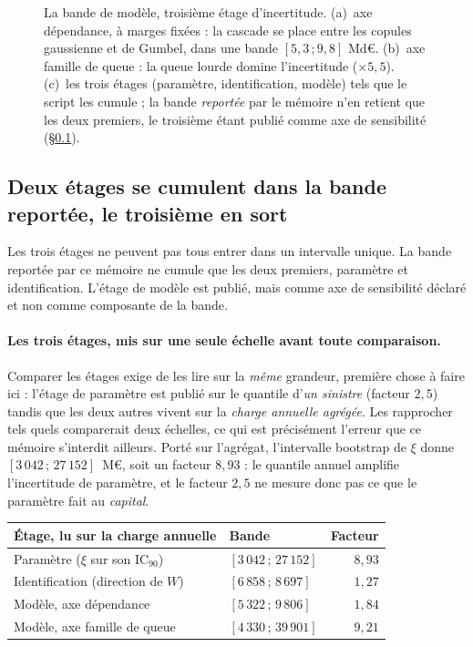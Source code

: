 \begin{figure}[htbp]\centering
{}
\caption{La bande de modèle, troisième étage d'incertitude. (a)~axe dépendance, à
marges fixées : la cascade se place entre les copules gaussienne et de Gumbel, dans une bande
$[5{,}3\,;9{,}8]$ Md\euro. (b)~axe famille de queue : la queue lourde domine
l'incertitude ($\times 5{,}5$). (c)~les trois étages (paramètre, identification,
modèle) tels que le script les cumule ; la bande \emph{reportée} par le mémoire n'en retient que
les deux premiers, le troisième étant publié comme axe de sensibilité
(\S\ref{sec:etage-modele-hors-bande}).}
\label{fig:bande-modele}
\end{figure}

\subsection{Deux étages se cumulent dans la bande reportée, le troisième en sort}
\label{sec:etage-modele-hors-bande}

Les trois étages ne peuvent pas tous entrer dans un intervalle unique. La bande reportée par ce mémoire ne cumule que les deux premiers,
paramètre et identification. L'étage de modèle est publié, mais comme axe de
sensibilité déclaré et non comme composante de la bande.

\paragraph{Les trois étages, mis sur une seule échelle avant toute comparaison.} Comparer les
étages exige de les lire sur la \emph{même} grandeur, première chose à faire ici :
l'étage de paramètre est publié sur le quantile d'\emph{un sinistre} (facteur $2{,}5$) tandis que
les deux autres vivent sur la \emph{charge annuelle agrégée}. Les rapprocher tels quels
comparerait deux échelles, ce qui est précisément l'erreur que ce mémoire s'interdit ailleurs.
Porté sur l'agrégat, l'intervalle bootstrap de $\xi$ donne $[3\,042\,;\,27\,152]$~M\euro, soit un
facteur $8{,}93$ : le quantile annuel amplifie l'incertitude de paramètre, et le facteur
$2{,}5$ ne mesure donc pas ce que le paramètre fait au \emph{capital}.

\begin{center}\footnotesize
\renewcommand{\arraystretch}{1.25}
\begin{tabular}{@{}l l r@{}}
\toprule
\textbf{Étage, lu sur la charge annuelle} & \textbf{Bande} & \textbf{Facteur} \\
\midrule
Paramètre ($\xi$ sur son IC$_{90}$) & $[3\,042\,;\,27\,152]$ & $8{,}93$ \\
Identification (direction de $W$) & $[6\,858\,;\,8\,697]$ & $1{,}27$ \\
Modèle, axe dépendance & $[5\,322\,;\,9\,806]$ & $1{,}84$ \\
Modèle, axe famille de queue & $[4\,330\,;\,39\,901]$ & $9{,}21$ \\
\bottomrule
\end{tabular}
\end{center}

